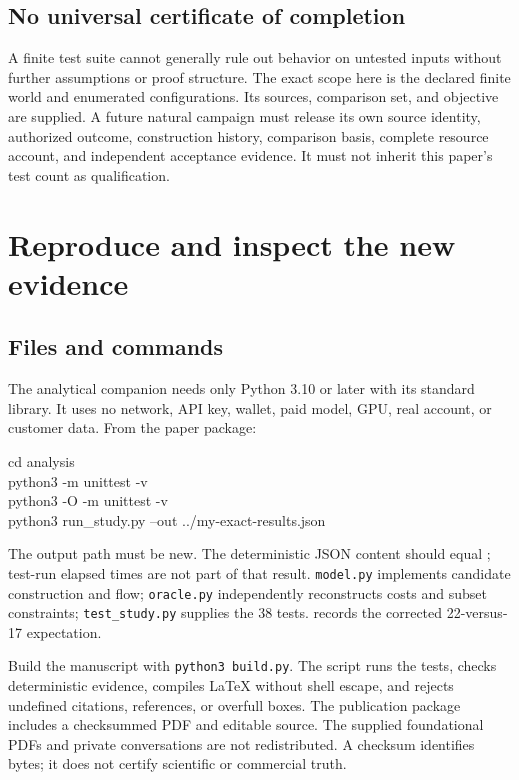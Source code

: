 \documentclass[11pt,a4paper]{article}
\begin{document}
\subsection{No universal certificate of completion}
A finite test suite cannot generally rule out behavior on untested inputs without further assumptions or proof structure. The exact scope here is the declared finite world and enumerated configurations. Its sources, comparison set, and objective are supplied. A future natural campaign must release its own source identity, authorized outcome, construction history, comparison basis, complete resource account, and independent acceptance evidence. It must not inherit this paper's test count as qualification.

\clearpage
\section{Reproduce and inspect the new evidence}
\subsection{Files and commands}
The analytical companion needs only Python 3.10 or later with its standard library. It uses no network, API key, wallet, paid model, GPU, real account, or customer data. From the paper package:
\begin{scopebox}
\small\ttfamily
cd analysis\\
python3 -m unittest -v\\
python3 -O -m unittest -v\\
python3 run\_study.py --out ../my-exact-results.json
\end{scopebox}
The output path must be new. The deterministic JSON content should equal ; test-run elapsed times are not part of that result. \texttt{model.py} implements candidate construction and flow; \texttt{oracle.py} independently reconstructs costs and subset constraints; \texttt{test\_study.py} supplies the 38 tests.  records the corrected 22-versus-17 expectation.

Build the manuscript with \texttt{python3 build.py}. The script runs the tests, checks deterministic evidence, compiles LaTeX without shell escape, and rejects undefined citations, references, or overfull boxes. The publication package includes a checksummed PDF and editable source. The supplied foundational PDFs and private conversations are not redistributed. A checksum identifies bytes; it does not certify scientific or commercial truth.
\end{document}
